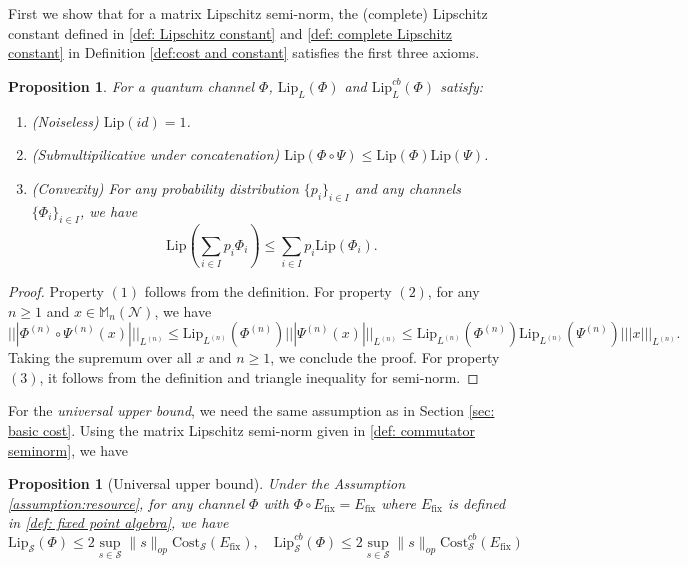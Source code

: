 \documentclass[11pt,reqno]{amsart}
\numberwithin{equation}{section}
\newtheorem{prop}[lemma]{Proposition}
\newcommand{\mb}{\mathbb}
\newcommand{\mc}{\mathcal}
\newcommand{\Lip}{\mathrm{Lip}}
\newcommand{\Cost}{\mathrm{Cost}}
\newcommand{\fix}{\mathrm{fix}}
\begin{document}
First we show that for a matrix Lipschitz semi-norm, the (complete) Lipschitz constant defined in \eqref{def: Lipschitz constant} and \eqref{def: complete Lipschitz constant} in Definition \ref{def:cost and constant} satisfies the first three axioms.
\begin{prop}
For a quantum channel $\Phi$, $\Lip_L(\Phi)$ and $\Lip^{cb}_L(\Phi)$ satisfy:
    \begin{enumerate}
\item (\textit{Noiseless}) $\Lip(id) = 1$.
\item (\textit{Submultipilicative under concatenation}) $\Lip(\Phi \circ \Psi) \le \Lip(\Phi) \Lip(\Psi)$. 
\item (\textit{Convexity}) For any probability distribution $\{p_i\}_{i\in I}$ and any channels $\{\Phi_i\}_{i \in I}$, we have 
\begin{equation}
\Lip(\sum_{i\in I} p_i\Phi_i) \le \sum_{i\in I} p_i \Lip(\Phi_i).
\end{equation} 
\end{enumerate}
\end{prop}
\begin{proof}
    Property $(1)$ follows from the definition. For property $(2)$, for any $n\ge 1$ and $x \in \mb M_n(\mc N)$, we have 
    \begin{equation}
        |||\Phi^{(n)}\circ \Psi^{(n)}(x)|||_{L^{(n)}} \le \Lip_{L^{(n)}}(\Phi^{(n)}) |||\Psi^{(n)}(x)|||_{L^{(n)}} \le \Lip_{L^{(n)}}(\Phi^{(n)}) \Lip_{L^{(n)}}(\Psi^{(n)}) |||x|||_{L^{(n)}}.
    \end{equation}
    Taking the supremum over all $x$ and $n\ge 1$, we conclude the proof. For property $(3)$, it follows from the definition and triangle inequality for semi-norm. 
\end{proof}
For the \textit{universal upper bound}, we need the same assumption as in Section \ref{sec: basic cost}. Using the matrix Lipschitz semi-norm given in \eqref{def: commutator seminorm}, we have
\begin{prop}[Universal upper bound]\label{main: universal bound constant}
    Under the Assumption \ref{assumption:resource}, for any channel $\Phi$ with $\Phi \circ E_\fix = E_\fix$ where $E_\fix$ is defined in \eqref{def: fixed point algebra}, we have  
    \begin{equation}
        \Lip_{\mc S}(\Phi) \le 2 \sup_{s\in \mc S}\|s\|_{op} \Cost_{\mc S}(E_\fix),\quad \Lip^{cb}_{\mc S}(\Phi) \le 2 \sup_{s\in \mc S}\|s\|_{op} \Cost^{cb}_{\mc S}(E_\fix)
    \end{equation}
\end{prop}
\end{document}
